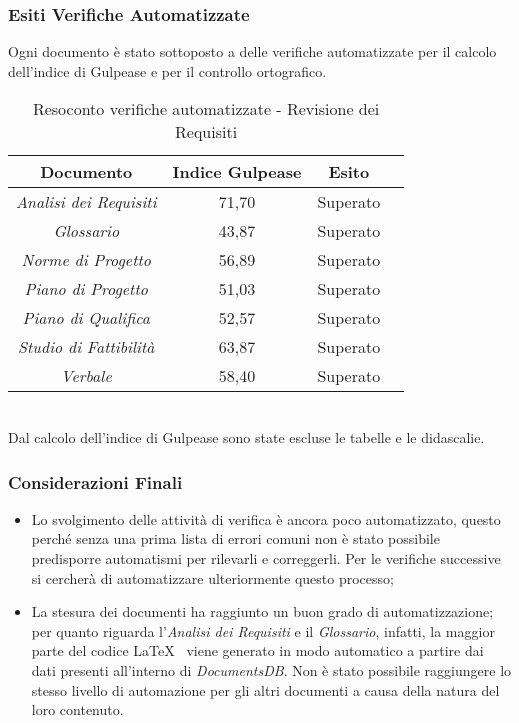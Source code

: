 \subsubsection{Esiti Verifiche Automatizzate}
Ogni documento è stato sottoposto a delle verifiche automatizzate per il calcolo dell'indice di Gulpease e per il controllo ortografico.
\begin{table}[h]
\begin{center}
\begin{tabular}{|c|c|c|c|}
\hline Documento & Indice Gulpease & Esito\\
\hline
\emph{Analisi dei Requisiti} & 71,70 & Superato \\
\emph{Glossario} & 43,87 & Superato \\
\emph{Norme di Progetto} & 56,89 & Superato \\
\emph{Piano di Progetto} & 51,03 & Superato \\
\emph{Piano di Qualifica} & 52,57  & Superato \\
\emph{Studio di Fattibilità} & 63,87 & Superato \\
\emph{Verbale} & 58,40 & Superato \\
\hline
\end{tabular}
\caption{Resoconto verifiche automatizzate - Revisione dei Requisiti}
\end{center}
\end{table}
\\Dal calcolo dell'indice di Gulpease sono state escluse le tabelle e le didascalie.

\subsubsection{Considerazioni Finali}
\begin{itemize}
\item Lo svolgimento delle attività di verifica è ancora poco automatizzato, questo perché senza una prima lista di errori comuni non è stato possibile predisporre automatismi per rilevarli e correggerli. Per le verifiche successive si cercherà di automatizzare ulteriormente questo processo;
\item La stesura dei documenti ha raggiunto un buon grado di automatizzazione; per quanto riguarda l'\textit{Analisi dei Requisiti} e il \textit{Glossario}, infatti, la maggior parte del codice \LaTeX~ viene generato in modo automatico a partire dai dati presenti all'interno di \textit{DocumentsDB}. Non è stato possibile raggiungere lo stesso livello di automazione per gli altri documenti a causa della natura del loro contenuto.
\end{itemize}